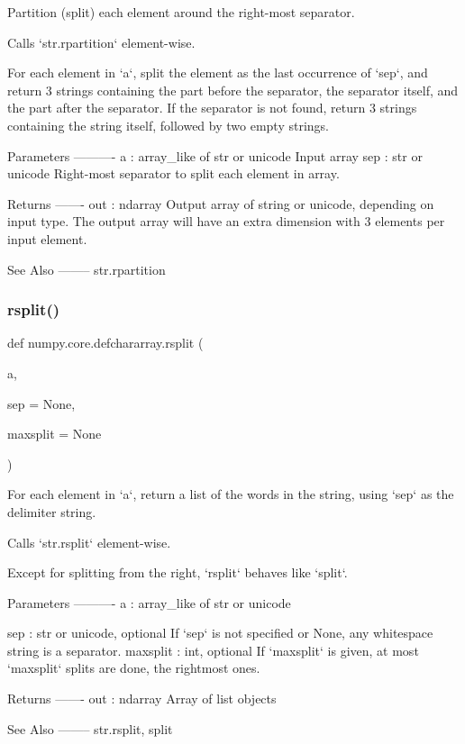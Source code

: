 \begin{DoxyVerb}Partition (split) each element around the right-most separator.

Calls `str.rpartition` element-wise.

For each element in `a`, split the element as the last
occurrence of `sep`, and return 3 strings containing the part
before the separator, the separator itself, and the part after
the separator. If the separator is not found, return 3 strings
containing the string itself, followed by two empty strings.

Parameters
----------
a : array_like of str or unicode
    Input array
sep : str or unicode
    Right-most separator to split each element in array.

Returns
-------
out : ndarray
    Output array of string or unicode, depending on input
    type.  The output array will have an extra dimension with
    3 elements per input element.

See Also
--------
str.rpartition\end{DoxyVerb}
 \mbox{\label{namespacenumpy_1_1core_1_1defchararray_ab29985f10b611ee504322e8a0fc69f0e}} 
\subsubsection{\texorpdfstring{rsplit()}{rsplit()}}
{\footnotesize\ttfamily def numpy.\+core.\+defchararray.\+rsplit (\begin{DoxyParamCaption}\item[{}]{a,  }\item[{}]{sep = {\ttfamily None},  }\item[{}]{maxsplit = {\ttfamily None} }\end{DoxyParamCaption})}

\begin{DoxyVerb}For each element in `a`, return a list of the words in the
string, using `sep` as the delimiter string.

Calls `str.rsplit` element-wise.

Except for splitting from the right, `rsplit`
behaves like `split`.

Parameters
----------
a : array_like of str or unicode

sep : str or unicode, optional
    If `sep` is not specified or None, any whitespace string
    is a separator.
maxsplit : int, optional
    If `maxsplit` is given, at most `maxsplit` splits are done,
    the rightmost ones.

Returns
-------
out : ndarray
   Array of list objects

See Also
--------
str.rsplit, split\end{DoxyVerb}
 \mbox{\label{namespacenumpy_1_1core_1_1defchararray_a39cd3d5901f81898ef004dedfa8c386c}} 

